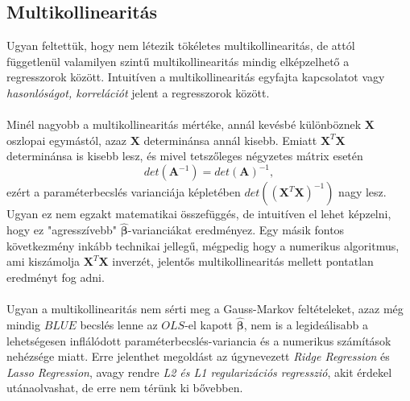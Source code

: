 \documentclass[14p]{report}
\def\pmb{\boldsymbol}
\def\ebeta{\hat{\pmb{\beta}}}
\newcounter{x}
\newcounter{y}
\newcounter{z}
\begin{document}
	\subsection{Multikollinearitás}
	Ugyan feltettük, hogy nem létezik tökéletes multikollinearitás, de attól függetlenül valamilyen szintű multikollinearitás mindig elképzelhető a regresszorok között. Intuitíven a multikollinearitás egyfajta kapcsolatot vagy \emph{hasonlóságot, korrelációt} jelent a regresszorok között.
	\\
	\\
	Minél nagyobb a multikollinearitás mértéke, annál kevésbé különböznek $\pmb{X}$ oszlopai egymástól, azaz $\pmb{X}$ determinánsa annál kisebb. Emiatt $\pmb{X}^T\pmb{X}$ determinánsa is kisebb lesz, és mivel tetszőleges négyzetes mátrix esetén
	\[
		det(\pmb{A}^{-1}) = det(\pmb{A})^{-1},
	\]
	ezért a paraméterbecslés varianciája képletében $det((\pmb{X}^T\pmb{X})^{-1})$ nagy lesz. Ugyan ez nem egzakt matematikai összefüggés, de intuitíven el lehet képzelni, hogy ez "agresszívebb" $\ebeta$-varianciákat eredményez. Egy másik fontos következmény inkább technikai jellegű, mégpedig hogy a numerikus algoritmus, ami kiszámolja $\pmb{X}^T\pmb{X}$ inverzét, jelentős multikollinearitás mellett pontatlan eredményt fog adni. 
	\\
	\\
	Ugyan a multikollinearitás nem sérti meg a Gauss-Markov feltételeket, azaz még mindig $BLUE$ becslés lenne az $OLS$-el kapott $\ebeta$, nem is a legideálisabb a lehetségesen inflálódott paraméterbecslés-variancia és a numerikus számítások nehézsége miatt. Erre jelenthet megoldást az úgynevezett \emph{Ridge Regression} és \emph{Lasso Regression}, avagy rendre \emph{L2 és L1 regularizációs regresszió}, akit érdekel utánaolvashat, de erre nem térünk ki bővebben.
	
\end{document}

